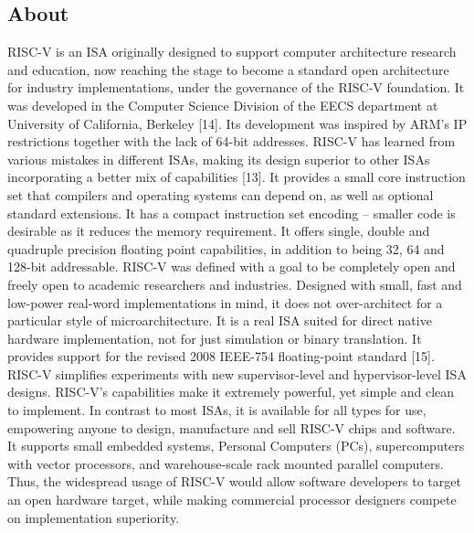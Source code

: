 \subsection{About}
 \label{sect6_1_1}
RISC-V is an ISA originally designed to support computer architecture research and education, now reaching the stage to become a standard open architecture for industry implementations, under the governance of the RISC-V foundation. It was developed in the Computer Science Division of the EECS department at University of California, Berkeley [14]. Its development was inspired by ARM’s IP restrictions together with the lack of 64-bit addresses. \newline\newline
RISC-V has learned from various mistakes in different ISAs, making its design superior to other ISAs incorporating a better mix of capabilities [13]. It provides a small core instruction set that compilers and operating systems can depend on, as well as optional standard extensions. It has a compact instruction set encoding – smaller code is desirable as it reduces the memory requirement. It offers single, double and quadruple precision floating point capabilities, in addition to being 32, 64 and 128-bit addressable. \newline\newline
RISC-V was defined with a goal to be completely open and freely open to academic researchers and industries. Designed with small, fast and low-power real-word implementations in mind, it does not over-architect for a particular style of microarchitecture. It is a real ISA suited for direct native hardware implementation, not for just simulation or binary translation. It provides support for the revised 2008 IEEE-754 floating-point standard [15]. RISC-V simplifies experiments with new supervisor-level and hypervisor-level ISA designs. \newline\newline
RISC-V’s capabilities make it extremely powerful, yet simple and clean to implement. In contrast to most ISAs, it is available for all types for use, empowering anyone to design, manufacture and sell RISC-V chips and software. It supports small embedded systems, Personal Computers (PCs), supercomputers with vector processors, and warehouse-scale rack mounted parallel computers. Thus, the widespread usage of RISC-V would allow software developers to target an open hardware target, while making commercial processor designers compete on implementation superiority. 

